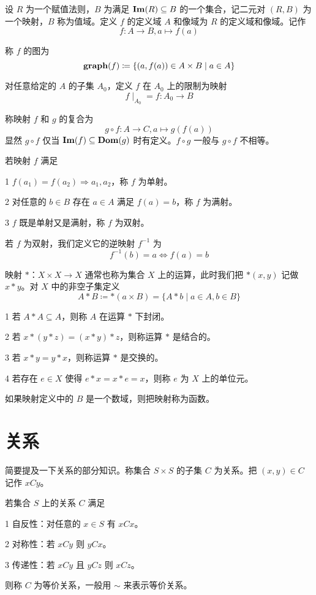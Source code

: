 \begin{definition}
	设 $R$ 为一个赋值法则，$B$ 为满足 $\operatorname{\mathbf{Im}}(R) \subseteq B$ 的一个集合，记二元对 $(R,B)$ 为一个映射，$B$ 称为值域。定义 $f$ 的定义域 $A$ 和像域为 $R$ 的定义域和像域。记作
	$$f:A\to B, a\mapsto f(a)$$
\end{definition}

称 $f$ 的图为
$$\operatorname{\mathbf{graph}}(f) \coloneqq  \{(a,f(a)) \in A\times B \mid a \in A\}$$

对任意给定的 $A$ 的子集 $A_0$，定义 $f$ 在 $A_0$ 上的限制为映射
$$f \mid_{A_0} = f : A_0 \to B$$

称映射 $f$ 和 $g$ 的复合为
$$g\circ f: A \to C, a \mapsto g(f(a))$$
显然 $g \circ f$ 仅当 $\operatorname{\mathbf{Im}}(f) \subseteq \operatorname{\mathbf{Dom}}(g)$ 时有定义。$f\circ g$ 一般与 $g \circ f$ 不相等。

若映射 $f$ 满足

\num{1} $f(a_1) = f(a_2) \Rightarrow a_1,a_2$，称 $f$ 为单射。

\num{2} 对任意的 $b\in B$ 存在 $a\in A$ 满足 $f(a)=b$，称 $f$ 为满射。

\num{3} $f$ 既是单射又是满射，称 $f$ 为双射。

若 $f$ 为双射，我们定义它的逆映射 $f^{-1}$ 为
$$f^{-1}(b) =  a \Leftrightarrow f(a) = b$$

映射 $\ast$：$X\times X \to X$ 通常也称为集合 $X$ 上的运算，此时我们把 $\ast(x,y)$ 记做 $x \ast y$。对 $X$ 中的非空子集定义
$$A \ast B \coloneqq  \ast(a\times B) = \{A \ast b \mid a \in A, b\in B\}$$

\begin{definition}
	\num{1} 若 $A \ast A \subseteq A$，则称 $A$ 在运算 $\ast$ 下封闭。

	\num{2} 若 $x \ast (y \ast z) = (x \ast y) \ast z$，则称运算 $\ast$ 是结合的。

	\num{3} 若 $x \ast y = y \ast x$，则称运算 $\ast$ 是交换的。

	\num{4} 若存在 $e \in X$ 使得 $e \ast x = x \ast e = x$，则称 $e$ 为 $X$ 上的单位元。
\end{definition}

如果映射定义中的 $B$ 是一个数域，则把映射称为函数。

\section{关系}

简要提及一下关系的部分知识。称集合 $S\times S$ 的子集 $C$ 为关系。把 $(x,y)\in C$ 记作 $xCy$。

\begin{definition}[等价关系]
	若集合 $S$ 上的关系 $C$ 满足

	\num{1} 自反性：对任意的 $x\in S$ 有 $xCx$。
	
	\num{2} 对称性：若 $xCy$ 则 $yCx$。

	\num{3} 传递性：若 $xCy$ 且 $yCz$ 则 $xCz$。

	则称 $C$ 为等价关系，一般用 $\sim$ 来表示等价关系。
\end{definition}

